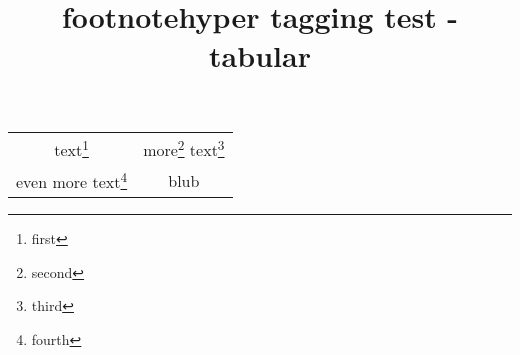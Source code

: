 \documentclass{article}
\title{footnotehyper tagging test - tabular}
\begin{document}
\begin{savenotes}
\begin{tabular}{cc}
text\footnote{first} & more\footnote{second} text\footnote{third} \\
even more text\footnote{fourth} & blub
\end{tabular}
\end{savenotes}
\end{document}
